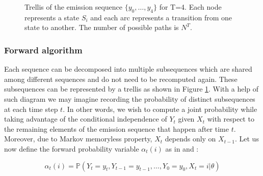 \begin{figure}[htbp]
\begin{center}
    \end{center}
    \caption[Trellis as a result of Forward-Backward algorithm]{Trellis of the emission sequence $\{y_0,\ldots, y_4\}$ for T=4. Each node represents a state $S_i$ and each arc represents a transition from one state to another. The number of possible paths is $N^T$. }
    \label{fig:trellis}
    \end{figure}

\subsubsection*{Forward algorithm}

Each sequence can be decomposed into multiple subsequences which are shared among different sequences and do not need to be recomputed again. 
These subsequences can be represented by a trellis as shown in Figure \ref{fig:trellis}. With a help of such diagram we may imagine recording the probability of 
distinct subsequences at each time step $t$. In other words, we wish to compute a joint probability while taking advantage 
of the conditional independence of $Y_t$ given $X_t$ with respect to the remaining elements of the emission sequence that happen after time $t$. 
Moreover, due to Markov memoryless property, $X_t$ depends only on $X_{t-1}$. Let us now define the forward probability variable $\alpha_t(i)$ as in \citep{Bishop2006} and \citep{Rabiner1989}:

\begin{equation}
    \alpha_t(i) = \mathbb{P}(Y_t = y_t, Y_{t-1} = y_{t-1},\ldots, Y_0 = y_0 , X_t = i| \theta)
\end{equation}

